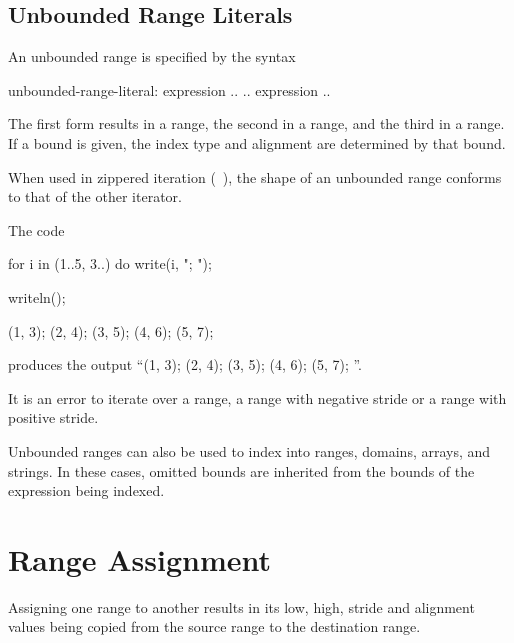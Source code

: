 \subsection{Unbounded Range Literals}
\label{Unbounded_Ranges}

An unbounded range is specified by the syntax
\begin{syntax}
unbounded-range-literal:
  expression ..
  .. expression
  ..
\end{syntax}

The first form results in a  range, the
second in a  range, and the third in
a  range.  If a bound is given, the index type and alignment are determined
by that bound.

When used in zippered iteration (~), the shape of an
unbounded range conforms to that of the other iterator.

\begin{example}
The code
\begin{chapelpre}
\end{chapelpre}
\begin{chapel}
for i in (1..5, 3..) do
  write(i, "; ");
\end{chapel}
\begin{chapelpost}
writeln();
\end{chapelpost}
\begin{chapeloutput}
(1, 3); (2, 4); (3, 5); (4, 6); (5, 7); 
\end{chapeloutput}
produces the output ``(1, 3); (2, 4); (3, 5); (4, 6); (5, 7); ''.
\end{example}

It is an error to iterate over a  range,
a  range with negative stride or a
 range with positive stride.

Unbounded ranges can also be used to index into ranges, domains,
arrays, and strings.  In these cases, omitted bounds are inherited
from the bounds of the expression being indexed.


\section{Range Assignment}
\label{Range_Assignment}

Assigning one range to another results in its low, high, stride and alignment
values being copied from the source range to the destination range.

